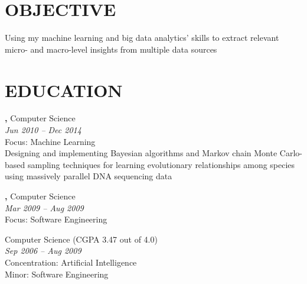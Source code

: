 \documentclass[margin, 10pt]{res} %
\begin{document}
\begin{resume}

 
\section{OBJECTIVE}  

Using my machine learning and big data analytics' skills to extract relevant micro- and macro-level insights from multiple data sources 



\section{EDUCATION}

{\bf \color{Black}{Doctor of Philosophy},} Computer Science \\
{} \hfill \textit{Jun 2010 -- Dec 2014} \\
Focus: Machine Learning \\
Designing and implementing Bayesian algorithms and Markov chain Monte Carlo-based sampling techniques for learning evolutionary relationships among species using massively parallel DNA sequencing data

{\bf \color{Black}{Exchange Student},} Computer Science \\
{\color{RubineRed}{University of Limerick, Ireland}} \hfill \textit{Mar 2009 -- Aug 2009} \\
Focus: Software Engineering 

{\bf \color{Black}{Master of Science,}} Computer Science (CGPA 3.47 out of 4.0) \\
{\color{RubineRed}{Lahore University of Management Sciences (LUMS), Pakistan}} \hfill \textit{Sep 2006 -- Aug 2009} \\
Concentration: Artificial Intelligence \\
Minor: Software Engineering


\end{resume}
\end{document}
